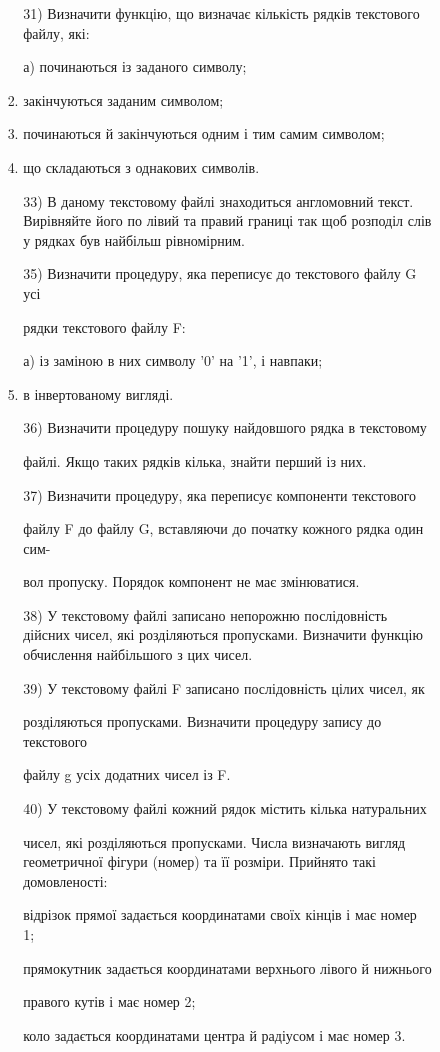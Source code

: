 \documentclass[]{article}
\makeatletter
\newcommand{\xslalph}[1]{\expandafter\@xslalph\csname c@#1\endcsname}
\newcommand{\@xslalph}[1]{%
    \ifcase#1\or а\or б\or в\or г\or д\or e\or є\or ж\or з\or i%
    \or й\or к\or л\or м\or н\or о\or п\or р\or с\or т%
    \or у\or ф\or х\or ц\or ч\or ш\or ю\or я\or аа\or бб\or вв%
    \else\@ctrerr\fi%
}
\makeatother
\begin{document}
\begin{enumerate}
\begin{enumerate}[label=\xslalph*)]
\begin{enumerate}
\begin{enumerate}[label=\xslalph*)]
31) Визначити функцію, що визначає кількість рядків текстового файлу,
які:

а) починаються із заданого символу;
\item закінчуються заданим символом;
\item починаються й закінчуються одним і тим самим символом;
\item що складаються з однакових символів.

33) В даному текстовому файлі знаходиться англомовний текст. Вирівняйте
його по лівий та правий границі так щоб розподіл слів у рядках був
найбільш рівномірним.

35) Визначити процедуру, яка переписує до текстового файлу G усі

рядки текстового файлу F:

а) із заміною в них символу '0' на '1', і навпаки;
\item в інвертованому вигляді.

36) Визначити процедуру пошуку найдовшого рядка в текстовому

файлі. Якщо таких рядків кілька, знайти перший із них.

37) Визначити процедуру, яка переписує компоненти текстового

файлу F до файлу G, вставляючи до початку кожного рядка один сим-

вол пропуску. Порядок компонент не має змінюватися.

38) У текстовому файлі записано непорожню послідовність дійсних чисел,
які розділяються пропусками. Визначити функцію обчислення найбільшого з
цих чисел.

39) У текстовому файлі F записано послідовність цілих чисел, як

розділяються пропусками. Визначити процедуру запису до текстового

файлу g усіх додатних чисел із F.

40) У текстовому файлі кожний рядок містить кілька натуральних

чисел, які розділяються пропусками. Числа визначають вигляд геометричної
фігури (номер) та її розміри. Прийнято такі домовленості:

відрізок прямої задається координатами своїх кінців і має номер 1;

прямокутник задається координатами верхнього лівого й нижнього

правого кутів і має номер 2;

коло задається координатами центра й радіусом і має номер 3.


\end{enumerate}
\end{enumerate}
\end{enumerate}
\end{enumerate}
\end{document}
